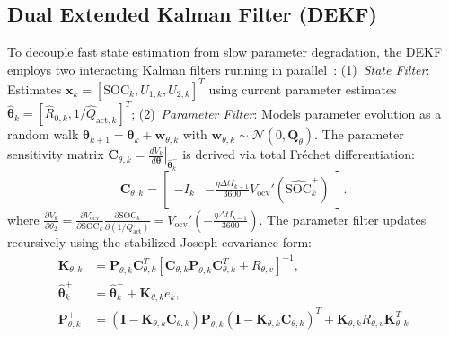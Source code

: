 \documentclass[balance,nocopyright,upint,varvw,hyphenate,barcolor=NavyBlue,nolists]{asmejour}
\begin{document}
\subsection{Dual Extended Kalman Filter (DEKF)}
To decouple fast state estimation from slow parameter degradation, the DEKF employs two interacting Kalman filters running in parallel~\cite{Plett2004part3,Charkhgard2010dekf}: (1)~\emph{State Filter}: Estimates $\mathbf{x}_k = [\text{SOC}_k, U_{1,k}, U_{2,k}]^T$ using current parameter estimates $\hat{\boldsymbol{\theta}}_k = [\hat{R}_{0,k}, 1/\hat{Q}_{\text{act},k}]^T$; (2)~\emph{Parameter Filter}: Models parameter evolution as a random walk $\boldsymbol{\theta}_{k+1} = \boldsymbol{\theta}_k + \mathbf{w}_{\theta,k}$ with $\mathbf{w}_{\theta,k} \sim \mathcal{N}(0, \mathbf{Q}_\theta)$. The parameter sensitivity matrix $\mathbf{C}_{\theta,k} = \left. \frac{d V_k}{d \boldsymbol{\theta}} \right|_{\hat{\boldsymbol{\theta}}_k^-}$ is derived via total Fréchet differentiation:
\begin{equation}\label{eqn:dekf_param_jacobian}
\mathbf{C}_{\theta,k} = \begin{bmatrix} -I_k & -\frac{\eta \Delta t I_{k-1}}{3600} V_{\text{ocv}}'(\widehat{\text{SOC}}_k^+) \end{bmatrix}.
\end{equation}
where $\frac{\partial V_k}{\partial \theta_2} = \frac{\partial V_{\text{ocv}}}{\partial \text{SOC}_k} \frac{\partial \text{SOC}_k}{\partial (1/Q_{\text{act}})} = V_{\text{ocv}}' \left(-\frac{\eta \Delta t I_{k-1}}{3600}\right)$. The parameter filter updates recursively using the stabilized Joseph covariance form:
\begin{align}
\mathbf{K}_{\theta,k} &= \mathbf{P}_{\theta,k}^- \mathbf{C}_{\theta,k}^T [ \mathbf{C}_{\theta,k} \mathbf{P}_{\theta,k}^- \mathbf{C}_{\theta,k}^T + R_{\theta,v} ]^{-1}, \label{eqn:dekf_param_gain}\\
\hat{\boldsymbol{\theta}}_k^+ &= \hat{\boldsymbol{\theta}}_k^- + \mathbf{K}_{\theta,k} e_k, \label{eqn:dekf_param_upd}\\
\mathbf{P}_{\theta,k}^+ &= (\mathbf{I} - \mathbf{K}_{\theta,k} \mathbf{C}_{\theta,k}) \mathbf{P}_{\theta,k}^- (\mathbf{I} - \mathbf{K}_{\theta,k} \mathbf{C}_{\theta,k})^T + \mathbf{K}_{\theta,k} R_{\theta,v} \mathbf{K}_{\theta,k}^T \label{eqn:dekf_param_cov}
\end{align}
\end{document}
